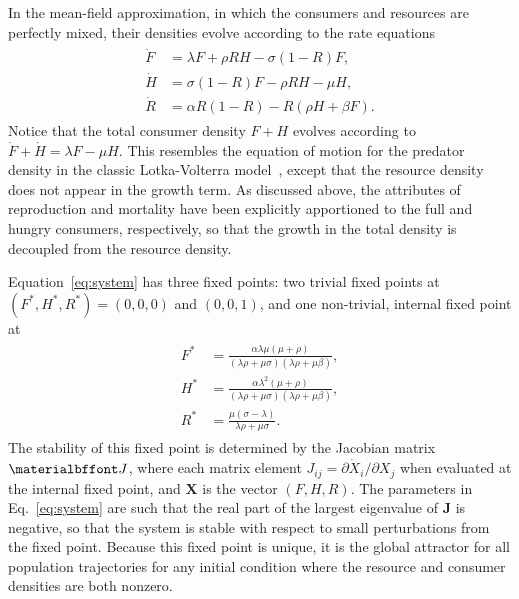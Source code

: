 \documentclass{pnastwo}
\begin{document}
\begin{article}
In the mean-field approximation, in which the consumers and resources are perfectly mixed, their densities evolve according to the rate equations
\begin{align} 
\label{eq:system}
\begin{split}
\dot{F} &= \lambda F + \rho RH - \sigma (1-R)F,  \\
\dot{H} &= \sigma (1-R)F - \rho RH - \mu H,  \\
\dot{R} &= \alpha R(1-R) - R(\rho H+ \beta F).
\end{split}
\end{align}
Notice that the total consumer density $F+H$ evolves according to $\dot{F}+\dot{H}=\lambda F-\mu H$.  
This resembles the equation of motion for the predator density in the classic Lotka-Volterra model~\cite{murray2011mathematical}, except that the resource density does not appear in the growth term.  
As discussed above, the attributes of reproduction and mortality have been explicitly apportioned to the full and hungry consumers, respectively, so that the growth in the total density is decoupled from the resource density.

Equation~\eqref{eq:system} has three fixed points: two trivial fixed points at $(F^*,H^*,R^*)=(0,0,0)$ and $(0,0,1)$, and one non-trivial, internal fixed point at
\begin{align}
\label{eq:ss}
\begin{split}
F^* &= \frac{\alpha  \lambda  \mu  (\mu +\rho )}{(\lambda  \rho +\mu  \sigma ) (\lambda  \rho +\mu  \beta)}, \\
H^* &= \frac{\alpha  \lambda ^2 (\mu +\rho )}{(\lambda  \rho +\mu  \sigma ) (\lambda  \rho +\mu  \beta)}, \\
R^* &= \frac{\mu  (\sigma -\lambda )}{\lambda  \rho +\mu  \sigma }.
\end{split}
\end{align}
The stability of this fixed point is determined by the Jacobian matrix $\bf J$, where each matrix element $J_{ij}=\partial{\dot X_i}/\partial{X_j}$ when evaluated at the internal fixed point, and $\mathbf{X}$ is the vector $(F,H,R)$.  
The parameters in Eq.~\eqref{eq:system} are such that the real part of the largest eigenvalue of $\mathbf{J}$ is negative, so that the system is stable with respect to small perturbations from the fixed point. 
Because this fixed point is unique, it is the global attractor for all population trajectories for any initial condition where the resource and consumer densities are both nonzero.


\end{article}
\end{document}
